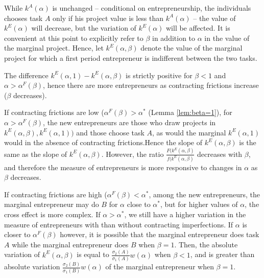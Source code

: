 \documentclass[12pt]{article}
\begin{document}
While $k^A(\alpha)$ is unchanged -- conditional on entrepreneurship, the individuals chooses task $A$ only if his project value is less than $k^A(\alpha)$ -- the value of $k^E(\alpha)$ will decrease, but  the variation of $k^E(\alpha)$ will be affected. It is convenient at this point to explicitly refer to $\beta$ in addition to $\alpha$ in the value of the marginal project. Hence, let $k^E(\alpha,\beta)$ denote the value of the marginal project for which a first period entrepreneur is indifferent between the two tasks. 

The difference $k^E(\alpha,1)-k^E(\alpha,\beta)$ is strictly positive for $\beta<1$ and $\alpha>\alpha^F(\beta)$, hence there are more entrepreneurs as contracting frictions increase ($\beta$ decreases). 

If contracting frictions are low ($\alpha^F(\beta)>\alpha^*$ (Lemma \ref{lem:beta=1}), for $\alpha>\alpha^F(\beta)$, the new entrepreneurs are those who draw projects in $k^E(\alpha,\beta),k^E(\alpha,1))$ and those choose task $A$, as would the marginal $k^E(\alpha,1)$ would in the absence of contracting frictions.Hence the slope of $k^E(\alpha,\beta)$ is the same as the slope of $k^E(\alpha,\beta)$. However, the ratio $\frac{F(k^E(\alpha,\beta)}{f(k^E(\alpha,\beta)}$ decreases with $\beta$, and therefore the measure of entrepreneurs is more responsive to changes in $\alpha$ as $\beta$ decreases.

If contracting frictions are high ($\alpha^F(\beta)<\alpha^*$, among the new entrepreneurs, the marginal entrepreneur may do $B$ for $\alpha$ close to $\alpha^*$, but for higher values of $\alpha$, the cross effect is more complex. If $\alpha>\alpha^*$, we still have a higher variation in the measure of entrepreneurs with than without contracting imperfections. If $\alpha$ is closer to $\alpha^F(\beta)$ however, it is possible that the marginal entrepreneur does task $A$ while the marginal entrepreneur does $B$ when $\beta=1$. Then, the absolute variation of $k^E(\alpha,\beta)$ is equal to $\frac{\sigma_2(A)}{\sigma_1(A)}w(\alpha)$ when $\beta<1$, and is greater than absolute variation   $\frac{\sigma_2(B)}{\sigma_1(B)}w(\alpha)$ of the marginal entrepreneur when $\beta=1$.


 
\end{document}
